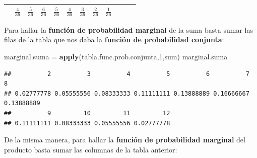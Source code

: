 \documentclass[]{book}
\newenvironment{Shaded}{\begin{snugshade}}{\end{snugshade}}
\newcommand{\DecValTok}[1]{\textcolor[rgb]{0.00,0.00,0.81}{#1}}
\newcommand{\KeywordTok}[1]{\textcolor[rgb]{0.13,0.29,0.53}{\textbf{#1}}}
\newcommand{\NormalTok}[1]{#1}
\newcommand{\StringTok}[1]{\textcolor[rgb]{0.31,0.60,0.02}{#1}}
\begin{document}
\begin{longtable}[]{@{}llllllllllll@{}}
\begin{minipage}[t]{0.06\columnwidth}
\end{minipage} & \begin{minipage}[t]{0.06\columnwidth}\raggedright
\(\frac{4}{36}\)\strut
\end{minipage} & \begin{minipage}[t]{0.06\columnwidth}\raggedright
\(\frac{5}{36}\)\strut
\end{minipage} & \begin{minipage}[t]{0.06\columnwidth}\raggedright
\(\frac{6}{36}\)\strut
\end{minipage} & \begin{minipage}[t]{0.06\columnwidth}\raggedright
\(\frac{5}{36}\)\strut
\end{minipage} & \begin{minipage}[t]{0.06\columnwidth}\raggedright
\(\frac{4}{36}\)\strut
\end{minipage} & \begin{minipage}[t]{0.06\columnwidth}\raggedright
\(\frac{3}{36}\)\strut
\end{minipage} & \begin{minipage}[t]{0.06\columnwidth}\raggedright
\(\frac{2}{36}\)\strut
\end{minipage} & \begin{minipage}[t]{0.06\columnwidth}\raggedright
\(\frac{1}{36}\)\strut
\end{minipage}\tabularnewline
\bottomrule
\end{longtable}

Para hallar la \textbf{función de probabilidad marginal} de la suma basta sumar las filas de la tabla que nos daba la \textbf{función de probabilidad conjunta}:

\begin{Shaded}
\begin{Highlighting}[]
\NormalTok{marginal.suma =}\StringTok{ }\KeywordTok{apply}\NormalTok{(tabla.func.prob.conjunta,}\DecValTok{1}\NormalTok{,sum)}
\NormalTok{marginal.suma}
\end{Highlighting}
\end{Shaded}

\begin{verbatim}
##          2          3          4          5          6          7          8 
## 0.02777778 0.05555556 0.08333333 0.11111111 0.13888889 0.16666667 0.13888889 
##          9         10         11         12 
## 0.11111111 0.08333333 0.05555556 0.02777778
\end{verbatim}

De la misma manera, para hallar la \textbf{función de probabilidad marginal} del producto basta sumar las columnas de la tabla anterior:
\end{document}
